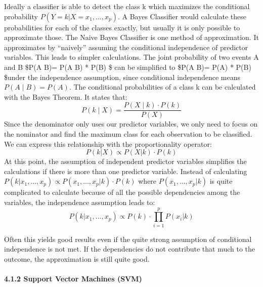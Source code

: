 \documentclass[
]{article}
\begin{document}
Ideally a classifier is able to detect the class k which maximizes the
conditional probability \(P(Y=k|X=x_{1},...,x_{p})\). A Bayes Classifier
would calculate these probabilities for each of the classes exactly, but
usually it is only possible to approximate those. The Naive Bayes
Classifier is one method of approximation. It approximates by
``naively'' assuming the conditional independence of predictor
variables. This leads to simpler calculations. The joint probability of
two events A and B \$P(A \cap B)= P(A \mid B) * P(B) \$ can be
simplified to \$P(A \cap B)= P(A) * P(B) \$under the independence
assumption, since conditional independence means \(P(A \mid B) = P(A)\).
The conditional probabilities of a class k can be calculated with the
Bayes Theorem. It states that:
\[P(k \mid X) = \frac {P(X\mid k) \cdot P(k)}{P(X)}\] Since the
denominator only uses our predictor variables, we only need to focus on
the nominator and find the maximum class for each observation to be
classified. We can express this relationship with the proportionality
operator: \[P(k|X) \propto P(X|k) \cdot P(k)\] At this point, the
assumption of independent predictor variables simplifies the
calculations if there is more than one predictor variable. Instead of
calculating
\(P(k|x_{1},...,x_{p}) \propto P(x_{1},...,x_{p}|k) \cdot P(k)\) where
\(P(x_{1},...,x_{p}|k)\) is quite complicated to calculate because of
all the possible dependencies among the variables, the independence
assumption leads to:
\[P(k|x_{1},...,x_{p}) \propto P(k) \cdot  \prod_{i=1}^{p} P(x_{i}|k) \]

Often this yields good results even if the quite strong assumption of
conditional independence is not met. If the dependencies do not
contribute that much to the outcome, the approximation is still quite
good.

\hypertarget{support-vector-machines-svm}{%
\paragraph{4.1.2 Support Vector Machines
(SVM)}\label{support-vector-machines-svm}}

~
\end{document}
